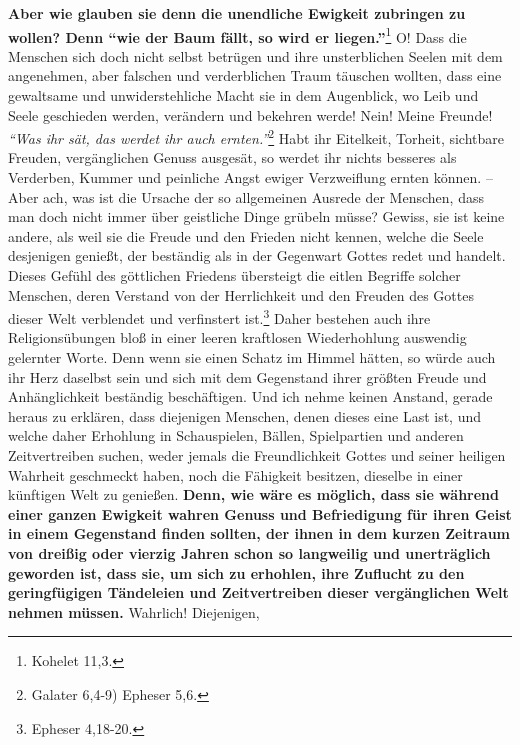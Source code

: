 \label{ref:15_06_langeweile}
\textbf{Aber wie glauben sie denn die unendliche Ewigkeit zubringen zu wollen?
Denn
"`wie der Baum fällt, so wird er liegen."'}\footnote{Kohelet 11,3.}
O! Dass die Menschen sich doch nicht selbst
betrügen und ihre unsterblichen Seelen mit dem angenehmen, aber falschen und
verderblichen Traum täuschen wollten, dass eine gewaltsame und unwiderstehliche
Macht sie in dem Augenblick, wo Leib und Seele geschieden werden, verändern und
bekehren werde! Nein! Meine Freunde!
\textit{"`Was ihr sät, das werdet ihr auch ernten."'}\footnote{Galater 6,4-9)
Epheser 5,6.}
Habt ihr Eitelkeit, Torheit,
sichtbare Freuden, vergänglichen Genuss ausgesät, so werdet ihr nichts besseres
als Verderben, Kummer und peinliche Angst ewiger Verzweiflung ernten können. --
Aber ach, was ist die Ursache der so allgemeinen Ausrede der Menschen, dass man
doch nicht immer über geistliche Dinge grübeln müsse? Gewiss, sie ist keine
andere, als weil sie die Freude und den Frieden nicht kennen, welche die Seele
desjenigen genießt, der beständig als in der Gegenwart
Gottes redet und handelt.
Dieses Gefühl des göttlichen Friedens übersteigt die eitlen Begriffe solcher
Menschen, deren Verstand von der Herrlichkeit und den Freuden des Gottes dieser
Welt verblendet und verfinstert ist.\footnote{Epheser 4,18-20.}
Daher bestehen
auch ihre Religionsübungen bloß in einer leeren kraftlosen Wiederhohlung
auswendig gelernter Worte. Denn wenn sie einen Schatz im Himmel hätten, so würde
auch ihr Herz daselbst sein und sich mit dem Gegenstand ihrer größten Freude
und Anhänglichkeit beständig beschäftigen. Und ich nehme keinen Anstand, gerade
heraus zu erklären, dass diejenigen Menschen, denen dieses eine Last ist, und
welche daher Erhohlung in Schauspielen, Bällen, Spielpartien
und anderen
Zeitvertreiben suchen, weder jemals die Freundlichkeit Gottes und seiner
heiligen Wahrheit geschmeckt haben, noch die Fähigkeit besitzen, dieselbe in
einer künftigen Welt zu genießen. \textbf{Denn, wie wäre es möglich, dass sie
während
einer ganzen Ewigkeit wahren Genuss und Befriedigung für ihren Geist in einem
Gegenstand finden sollten, der ihnen in dem kurzen Zeitraum von dreißig oder
vierzig Jahren schon so langweilig und unerträglich geworden ist, dass sie, um
sich zu erhohlen, ihre Zuflucht zu den geringfügigen Tändeleien und
Zeitvertreiben dieser vergänglichen Welt nehmen müssen.} Wahrlich! Diejenigen,
